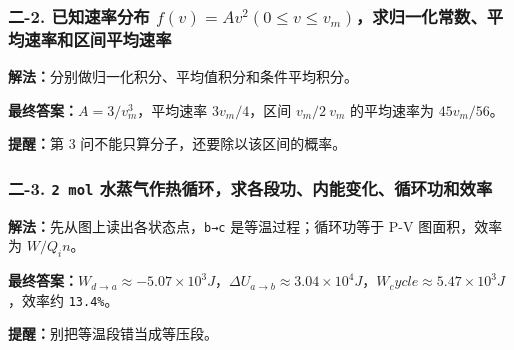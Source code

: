 \documentclass[12pt,a4paper]{ctexart}
\begin{document}
\subsubsection*{二-2. 已知速率分布 \(f(v)=Av^2 (0≤v≤v_m)\)，求归一化常数、平均速率和区间平均速率}
\begin{tcolorbox}[colback=gray!2!white,colframe=black!60,title={题目}]

\end{tcolorbox}
\begin{tcolorbox}[colback=blue!2!white,colframe=blue!55!black,title={完整答案}]
\textbf{解法：}分别做归一化积分、平均值积分和条件平均积分。\par
\textbf{最终答案：}\(A=3/v_m^3\)，平均速率 \(3v_m/4\)，区间 \(v_m/2~v_m\) 的平均速率为 \(45v_m/56\)。\par

\end{tcolorbox}
\begin{tcolorbox}[colback=red!2!white,colframe=red!55!black,title={易错点}]
\textbf{提醒：}第 3 问不能只算分子，还要除以该区间的概率。\par
\end{tcolorbox}

\subsubsection*{二-3. \texttt{2 mol} 水蒸气作热循环，求各段功、内能变化、循环功和效率}
\begin{tcolorbox}[colback=gray!2!white,colframe=black!60,title={题目}]

\end{tcolorbox}
\begin{tcolorbox}[colback=blue!2!white,colframe=blue!55!black,title={完整答案}]
\textbf{解法：}先从图上读出各状态点，\texttt{b→c} 是等温过程；循环功等于 P-V 图面积，效率为 \(W/Q_in\)。\par
\textbf{最终答案：}\(W_{d→a}≈-5.07×10^3 J\)，\(ΔU_{a→b}≈3.04×10^4 J\)，\(W_cycle≈5.47×10^3 J\)，效率约 \texttt{13.4\%}。\par

\end{tcolorbox}
\begin{tcolorbox}[colback=red!2!white,colframe=red!55!black,title={易错点}]
\textbf{提醒：}别把等温段错当成等压段。\par
\end{tcolorbox}
\end{document}
